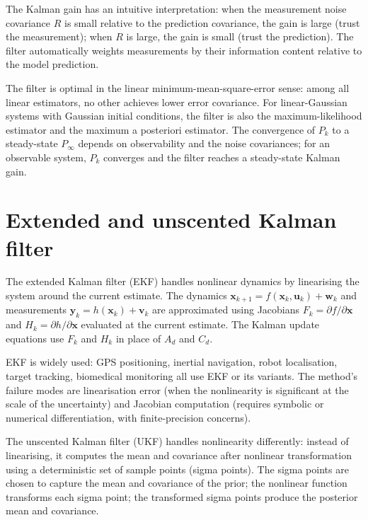 The Kalman gain has an intuitive interpretation: when the measurement noise covariance $R$ is small relative to the prediction covariance, the gain is large (trust the measurement); when $R$ is large, the gain is small (trust the prediction). The filter automatically weights measurements by their information content relative to the model prediction.

The filter is optimal in the linear minimum-mean-square-error sense: among all linear estimators, no other achieves lower error covariance. For linear-Gaussian systems with Gaussian initial conditions, the filter is also the maximum-likelihood estimator and the maximum a posteriori estimator. The convergence of $P_k$ to a steady-state $P_\infty$ depends on observability and the noise covariances; for an observable system, $P_k$ converges and the filter reaches a steady-state Kalman gain.

\section{Extended and unscented Kalman filter}

The extended Kalman filter (EKF) handles nonlinear dynamics by linearising the system around the current estimate. The dynamics $\mathbf{x}_{k+1} = f(\mathbf{x}_k, \mathbf{u}_k) + \mathbf{w}_k$ and measurements $\mathbf{y}_k = h(\mathbf{x}_k) + \mathbf{v}_k$ are approximated using Jacobians $F_k = \partial f / \partial \mathbf{x}$ and $H_k = \partial h / \partial \mathbf{x}$ evaluated at the current estimate. The Kalman update equations use $F_k$ and $H_k$ in place of $A_d$ and $C_d$.

EKF is widely used: GPS positioning, inertial navigation, robot localisation, target tracking, biomedical monitoring all use EKF or its variants. The method's failure modes are linearisation error (when the nonlinearity is significant at the scale of the uncertainty) and Jacobian computation (requires symbolic or numerical differentiation, with finite-precision concerns).

The unscented Kalman filter (UKF) handles nonlinearity differently: instead of linearising, it computes the mean and covariance after nonlinear transformation using a deterministic set of sample points (sigma points). The sigma points are chosen to capture the mean and covariance of the prior; the nonlinear function transforms each sigma point; the transformed sigma points produce the posterior mean and covariance.

